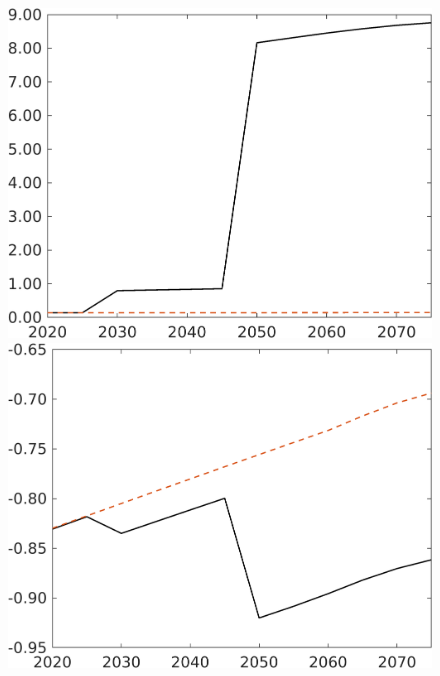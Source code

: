 \begin{figure}[h!!]
\begin{minipage}[]{0.32\textwidth}
\end{minipage}
	\begin{minipage}[]{0.32\textwidth}
	\includegraphics[width=1\textwidth]{../../codding_model/own_basedOnFried/optimalPol_190722_tidiedUp/figures/all_July22/GFF_TargetCompSP_T_spillover0_noskill0_sep1_xgrowth0_etaa0.79_lgd0.png}
\end{minipage}
	\begin{minipage}[]{0.32\textwidth}
	\includegraphics[width=1\textwidth]{../../codding_model/own_basedOnFried/optimalPol_190722_tidiedUp/figures/all_July22/SWF_TargetCompSP_T_spillover0_noskill0_sep1_xgrowth0_etaa0.79_lgd0.png}
\end{minipage}
\end{figure}

